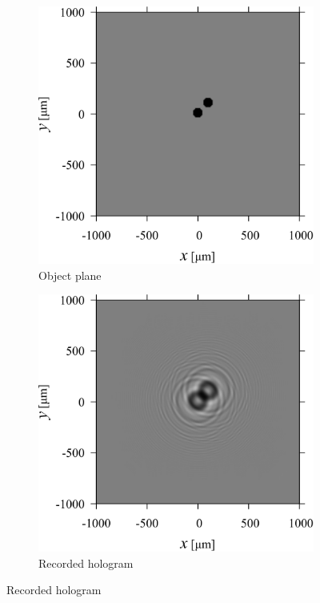 \begin{figure}[htbp]
    \centering
    \begin{subfigure}[b]{0.45\linewidth}
        \includegraphics[width=\linewidth]{./Figure/2_Theory/spectrum_example/a.pdf}
        \caption{Object plane}
        \label{fig:2particleSpectrum:a}
    \end{subfigure}
    \hfill
    \begin{subfigure}[b]{0.45\linewidth}
        \includegraphics[width=\linewidth]{./Figure/2_Theory/spectrum_example/b.pdf}
        \caption{Recorded hologram}
        \label{fig:2particleSpectrum:b}
    \end{subfigure}


\end{figure}
